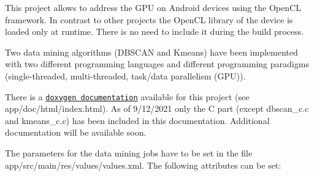 This project allows to address the G\+PU on Android devices using the Open\+CL framework. In contrast to other projects the Open\+CL library of the device is loaded only at runtime. There is no need to include it during the build process.

Two data mining algorithms (D\+B\+S\+C\+AN and Kmeans) have been implemented with two different programming languages and different programming paradigms (single-\/threaded, multi-\/threaded, task/data parallelism (G\+PU)).

There is a \href{app/doc/html/index.html}{\tt doxygen documentation} available for this project (see app/doc/html/index.\+html). As of 9/12/2021 only the C part (except dbscan\+\_\+c.\+c and kmeans\+\_\+c.\+c) has been included in this documentation. Additional documentation will be available soon.

The parameters for the data mining jobs have to be set in the file app/src/main/res/values/values.\+xml. The following attributes can be set\+:



